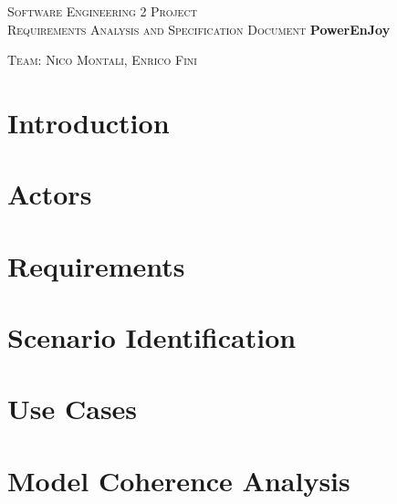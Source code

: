 \documentclass[a4paper,12pt,oneside]{book}
\begin{document}
	
	\pagestyle{empty}\centering
	\textsc{\Large Software Engineering 2 Project\\}
	\textsc{Requirements Analysis and Specification Document}
	\vfill
	\textbf{\Huge PowerEnJoy}
	
	\vfill
	\textsc{\Large Team: Nico Montali, Enrico Fini}
	
	\tableofcontents

	\begin{flushleft}
	\chapter{Introduction}\label{cap:Intro}
	
	\chapter{Actors}\label{cap:Actors}
	
	\chapter{Requirements}\label{cap:Requirements}
	
	\chapter{Scenario Identification}\label{cap:ScenarioIdentifying}
	
	\chapter{Use Cases}\label{cap:usecases}
	
	\chapter{Model Coherence Analysis}\label{cap:Alloy}
	
	\end{flushleft}
\end{document}
